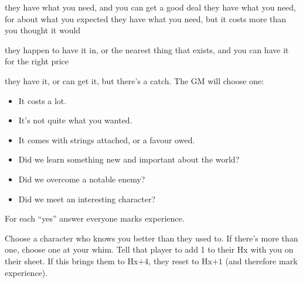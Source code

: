 {they have what you need, and you can get a good deal}
{they have what you need, for about what you expected}
{they have what you need, but it costs more than you thought it would}

{they happen to have it in, or the nearest thing that exists, and you can have it for the right price}
{they have it, or can get it, but there's a catch. The GM will choose one:
\begin{itemize}
\item It costs a lot.
\item It's not quite what you wanted.
\item It comes with strings attached, or a favour owed.
\end{itemize}}

\begin{itemize}
\item Did we learn something new and important about the world?
\item Did we overcome a notable enemy?
\item Did we meet an interesting character?
\end{itemize}

For each ``yes'' answer everyone marks experience.

Choose a character who knows you better than they used to. If there's
more than one, choose one at your whim. Tell that player to add 1 to
their Hx with you on their sheet. If this brings them to Hx$+4$, they
reset to Hx$+1$ (and therefore mark experience).
